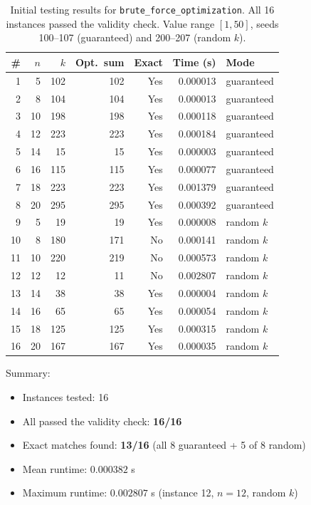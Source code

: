 \documentclass[12pt,a4paper]{article}
\theoremstyle{definition}
\begin{document}
\begin{table}[h!]
  \centering
  \renewcommand{\arraystretch}{1.3}
  \begin{tabular}{rrrrrrl}
    \toprule
    \# & $n$ & $k$ & Opt.\ sum & Exact & Time (s) & Mode \\
    \midrule
     1 &  5 &  102 &  102 & Yes & 0.000013 & guaranteed \\
     2 &  8 &  104 &  104 & Yes & 0.000013 & guaranteed \\
     3 & 10 &  198 &  198 & Yes & 0.000118 & guaranteed \\
     4 & 12 &  223 &  223 & Yes & 0.000184 & guaranteed \\
     5 & 14 &   15 &   15 & Yes & 0.000003 & guaranteed \\
     6 & 16 &  115 &  115 & Yes & 0.000077 & guaranteed \\
     7 & 18 &  223 &  223 & Yes & 0.001379 & guaranteed \\
     8 & 20 &  295 &  295 & Yes & 0.000392 & guaranteed \\
    \midrule
     9 &  5 &   19 &   19 & Yes & 0.000008 & random $k$ \\
    10 &  8 &  180 &  171 & No  & 0.000141 & random $k$ \\
    11 & 10 &  220 &  219 & No  & 0.000573 & random $k$ \\
    12 & 12 &   12 &   11 & No  & 0.002807 & random $k$ \\
    13 & 14 &   38 &   38 & Yes & 0.000004 & random $k$ \\
    14 & 16 &   65 &   65 & Yes & 0.000054 & random $k$ \\
    15 & 18 &  125 &  125 & Yes & 0.000315 & random $k$ \\
    16 & 20 &  167 &  167 & Yes & 0.000035 & random $k$ \\
    \bottomrule
  \end{tabular}
  \caption{Initial testing results for \texttt{brute\_force\_optimization}. All 16 instances
  passed the validity check. Value range $[1,50]$, seeds 100--107 (guaranteed) and
  200--207 (random $k$).}
  \label{tab:initial}
\end{table}

\noindent Summary:

\begin{itemize}[noitemsep]
  \item Instances tested: 16
  \item All passed the validity check: \textbf{16/16}
  \item Exact matches found: \textbf{13/16}
        (all 8 guaranteed + 5 of 8 random)
  \item Mean runtime: $0.000382$ s
  \item Maximum runtime: $0.002807$ s (instance 12, $n = 12$, random $k$)
\end{itemize}
\end{document}
